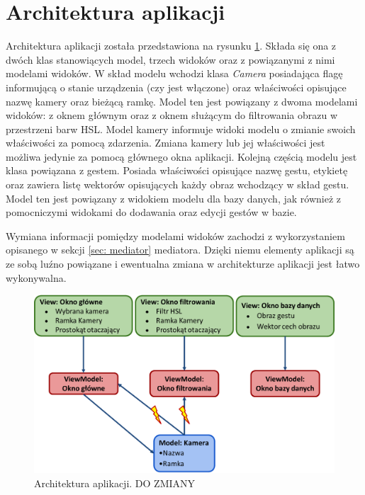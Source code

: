 \section{Architektura aplikacji}
Architektura aplikacji została przedstawiona na rysunku \ref{im: AppArchitectureWithHsl}. Składa się ona z dwóch klas stanowiących model, trzech widoków oraz z powiązanymi z nimi modelami widoków. W skład modelu wchodzi klasa \textit{Camera} posiadająca flagę informującą o stanie urządzenia (czy jest włączone) oraz właściwości opisujące nazwę kamery oraz bieżącą ramkę. Model ten jest powiązany z dwoma modelami widoków: z oknem głównym oraz z oknem służącym do filtrowania obrazu w przestrzeni barw HSL. Model kamery informuje widoki modelu o zmianie swoich właściwości za pomocą zdarzenia. Zmiana kamery lub jej właściwości jest możliwa jedynie za pomocą głównego okna aplikacji. Kolejną częścią modelu jest klasa powiązana z gestem. Posiada właściwości opisujące nazwę gestu, etykietę oraz zawiera listę wektorów opisujących każdy obraz wchodzący w skład gestu. Model ten jest powiązany z widokiem modelu dla bazy danych, jak również z pomocniczymi widokami do dodawania oraz edycji gestów w bazie.

Wymiana informacji pomiędzy modelami widoków zachodzi z wykorzystaniem opisanego w sekcji \ref{sec: mediator} mediatora. Dzięki niemu elementy aplikacji są ze sobą luźno powiązane i ewentualna zmiana w architekturze aplikacji jest łatwo wykonywalna. 
\begin{figure}[h]
	\centering
	\includegraphics[width=16cm]{AppArchitectureWithHsl}
	\centering
	\caption{Architektura aplikacji. DO ZMIANY}
	\label{im: AppArchitectureWithHsl}
\end{figure}

